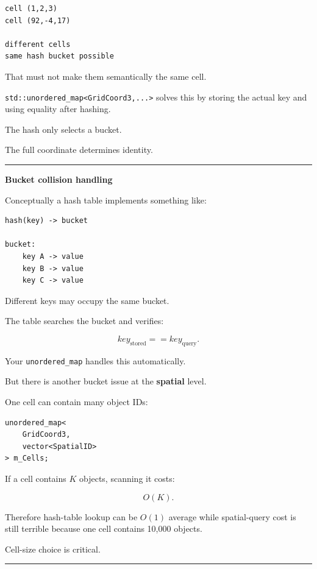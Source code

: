 \begin{verbatim}
cell (1,2,3)
cell (92,-4,17)

different cells
same hash bucket possible
\end{verbatim}

That must not make them semantically the same cell.

\texttt{std::unordered\_map\textless{}GridCoord3,...\textgreater{}} solves this by storing the actual key and using equality after hashing.

The hash only selects a bucket.

The full coordinate determines identity.

\begin{center}\rule{0.5\linewidth}{0.5pt}\end{center}

\textbf{Bucket collision handling}

Conceptually a hash table implements something like:

\begin{verbatim}
hash(key) -> bucket

bucket:
    key A -> value
    key B -> value
    key C -> value
\end{verbatim}

Different keys may occupy the same bucket.

The table searches the bucket and verifies:

\[
key_{\text{stored}}==key_{\text{query}}.
\]

Your \texttt{unordered\_map} handles this automatically.

But there is another bucket issue at the \textbf{spatial} level.

One cell can contain many object IDs:

\begin{verbatim}
unordered_map<
    GridCoord3,
    vector<SpatialID>
> m_Cells;
\end{verbatim}

If a cell contains \(K\) objects, scanning it costs:

\[
O(K).
\]

Therefore hash-table lookup can be \(O(1)\) average while spatial-query cost is still terrible because one cell contains 10,000 objects.

Cell-size choice is critical.

\begin{center}\rule{0.5\linewidth}{0.5pt}\end{center}

